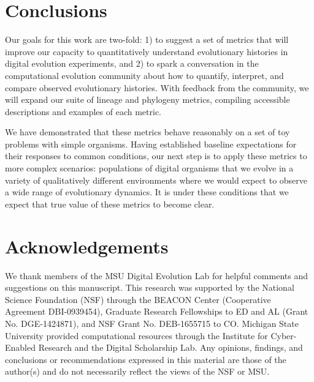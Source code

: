 \documentclass[letterpaper]{article}
\begin{document}
\section{Conclusions}


Our goals for this work are two-fold: 1) to suggest a set of metrics that will improve our capacity to quantitatively understand evolutionary histories in digital evolution experiments, and 2) to spark a conversation in the computational evolution community about how to quantify, interpret, and compare observed evolutionary histories. With feedback from the community, we will expand our suite of lineage and phylogeny metrics, compiling accessible descriptions and examples of each metric. 

We have demonstrated that %
these metrics behave reasonably on a set of toy problems with simple organisms. Having established baseline expectations for their responses to common conditions, our next step is to apply these metrics to more complex scenarios: populations of digital organisms that we evolve in a variety of qualitatively different environments where we would expect to observe a wide range of evolutionary dynamics. It is under these conditions that we expect that true value of these metrics to become clear.

\section{Acknowledgements}




We thank members of the MSU Digital Evolution Lab for helpful comments and suggestions on this manuscript. This research was supported by the National Science Foundation (NSF) through the BEACON Center (Cooperative Agreement DBI-0939454), Graduate Research Fellowships to ED and AL (Grant No. DGE-1424871), and NSF Grant No. DEB-1655715 to CO. Michigan State University provided computational resources through the Institute for Cyber-Enabled Research and the Digital Scholarship Lab. Any opinions, findings, and conclusions or recommendations expressed in this material are those of the author(s) and do not necessarily reflect the views of the NSF or MSU.

\setlength{\bibsep}{2pt}

\footnotesize

\end{document}
